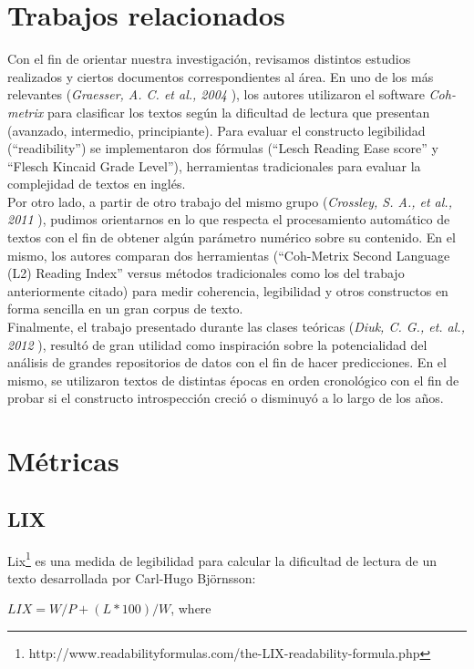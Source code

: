 \documentclass[12pt,journal,compsoc]{IEEEtran}
\begin{document}
\section{Trabajos relacionados}
Con el fin de orientar nuestra investigación, revisamos distintos estudios realizados y ciertos documentos correspondientes al área. En uno de los más relevantes (\textit{Graesser, A. C. et al., 2004} \cite{graesser}), los autores utilizaron el software \textit{Coh-metrix} para clasificar los textos según la dificultad de lectura que presentan (avanzado, intermedio, principiante). Para evaluar el constructo legibilidad (``readibility'') se implementaron dos fórmulas (``Lesch Reading Ease score'' y ``Flesch Kincaid Grade Level''), herramientas tradicionales para evaluar la complejidad de textos en inglés.\\
Por otro lado, a partir de otro trabajo del mismo grupo (\textit{Crossley, S. A., et al., 2011} \cite{crossley}), pudimos orientarnos en lo que respecta el procesamiento automático de textos con el fin de obtener algún parámetro numérico sobre su contenido. En el mismo, los autores comparan dos herramientas (``Coh-Metrix Second Language (L2) Reading Index'' versus métodos tradicionales como los del trabajo anteriormente citado) para medir coherencia, legibilidad y otros constructos en forma sencilla en un gran corpus de texto.\\
Finalmente, el trabajo presentado durante las clases teóricas (\textit{Diuk, C. G., et. al., 2012} \cite{diuk}), resultó de gran utilidad como inspiración sobre la potencialidad del análisis de grandes repositorios de datos con el fin de hacer predicciones. En el mismo, se utilizaron  textos de distintas épocas en orden cronológico con el fin de probar si el constructo introspección creció o disminuyó a lo largo de los años.

\section{Métricas}

\subsection{LIX}

Lix\footnote{http://www.readabilityformulas.com/the-LIX-readability-formula.php} es una medida de legibilidad para calcular la dificultad de lectura de un texto desarrollada por Carl-Hugo Björnsson:

$LIX = W/P + (L * 100)/W$, where
\end{document}
